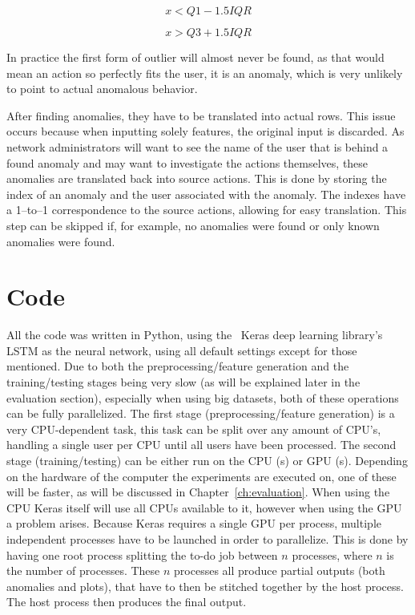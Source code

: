 $$ x < Q1 - 1.5 IQR $$

$$ x > Q3 + 1.5 IQR $$

In practice the first form of outlier will almost never be found, as that would mean an action so perfectly fits the user, it is an anomaly, which is very unlikely to point to actual anomalous behavior.

After finding anomalies, they have to be translated into actual rows. This issue occurs because when inputting solely features, the original input is discarded. As network administrators will want to see the name of the user that is behind a found anomaly and may want to investigate the actions themselves, these anomalies are translated back into source actions. This is done by storing the index of an anomaly and the user associated with the anomaly. The indexes have a 1--to--1 correspondence to the source actions, allowing for easy translation. This step can be skipped if, for example, no anomalies were found or only known anomalies were found.

\section{Code}
All the code was written in Python, using the~\cite{chollet2015keras} Keras deep learning library's LSTM as the neural network, using all default settings except for those mentioned. Due to both the preprocessing/feature generation and the training/testing stages being very slow (as will be explained later in the evaluation section), especially when using big datasets, both of these operations can be fully parallelized. The first stage (preprocessing/feature generation) is a very CPU-dependent task, this task can be split over any amount of CPU's, handling a single user per CPU until all users have been processed. The second stage (training/testing) can be either run on the CPU (s) or GPU (s). Depending on the hardware of the computer the experiments are executed on, one of these will be faster, as will be discussed in Chapter~\ref{ch:evaluation}. When using the CPU Keras itself will use all CPUs available to it, however when using the GPU a problem arises. Because Keras requires a single GPU per process, multiple independent processes have to be launched in order to parallelize. This is done by having one root process splitting the to-do job between \(n\) processes, where \(n\) is the number of processes. These \(n\) processes all produce partial outputs (both anomalies and plots), that have to then be stitched together by the host process. The host process then produces the final output.
